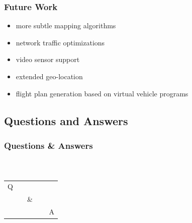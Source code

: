 \documentclass{beamer}
\begin{document}
\begin{frame}\frametitle{Future Work} %
	\begin{itemize}
		\item more subtle mapping algorithms
		\item network traffic optimizations
		\item video sensor support
		\item extended geo-location
		\item flight plan generation based on virtual vehicle programs
	\end{itemize}
\end{frame}
 

\subsection{Questions and Answers}

\begin{frame}
	\frametitle<presentation>{Questions \& Answers}
	\framesubtitle{~}
	\begin{center}
		\fontsize{64}{64}\selectfont
		\begin{tabular}{ccc}
			Q &&\\
			& ~~\& & \\
			&&~~ A
		\end{tabular}
	\end{center}
\end{frame}
\end{document}
